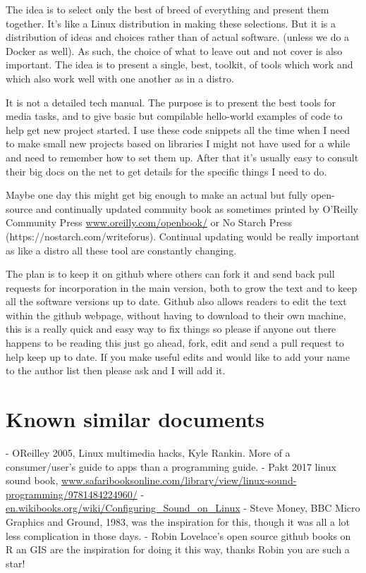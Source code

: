 \documentclass[oneside,english]{scrbook}
\begin{document}
The idea is to select only the best of breed of everything and present them together. It's like a Linux distribution in making these selections. But it is a distribution of ideas and choices rather than of actual software. (unless we do a Docker as well).   As such, the choice of what to leave out and not cover is also important. The idea is to present a single, best, toolkit, of tools which work and which also work well with one another as in a distro.

It is not a detailed tech manual. The purpose is to present the best tools for media tasks, and to give basic but compilable hello-world examples of code to help get new project started. I use these code snippets all the time when I need to make small new projects based on libraries I might not have used for a while and need to remember how to set them up.  After that it's usually easy to consult their big docs on the net to get details for the specific things I need to do.

Maybe one day this might get big enough to make an actual but fully open-source and continually updated commuity book as sometimes printed by O'Reilly Community Press \url{www.oreilly.com/openbook/} or No Starch Press (https://nostarch.com/writeforus).  Continual updating would be really important as like a distro all these tool are constantly changing.  

The plan is to keep it on github where others can fork it and send back pull requests for incorporation in the main version, both to grow the text and to keep all the software versions up to date. Github also allows readers to edit the text within the github webpage, without having to download to their own machine, this is a really quick and easy way to fix things so please if anyone out there happens to be reading this just go ahead, fork, edit and send a pull request to help keep up to date. If you make useful edits and would like to add your name to the author list then please ask and I will add it.

\section{Known similar documents}
- OReilley 2005, Linux multimedia hacks, Kyle Rankin. More of a consumer/user's guide to apps than a programming guide.
- Pakt 2017 linux sound book, \url{www.safaribooksonline.com/library/view/linux-sound-programming/9781484224960/}
- \url{en.wikibooks.org/wiki/Configuring_Sound_on_Linux} 
- Steve Money, BBC Micro Graphics and Ground, 1983, was the inspiration for this, though it was all a lot less complication in those days.
- Robin Lovelace's open source github books on R an GIS are the inspiration for doing it this way, thanks Robin you are such a star!
\end{document}

